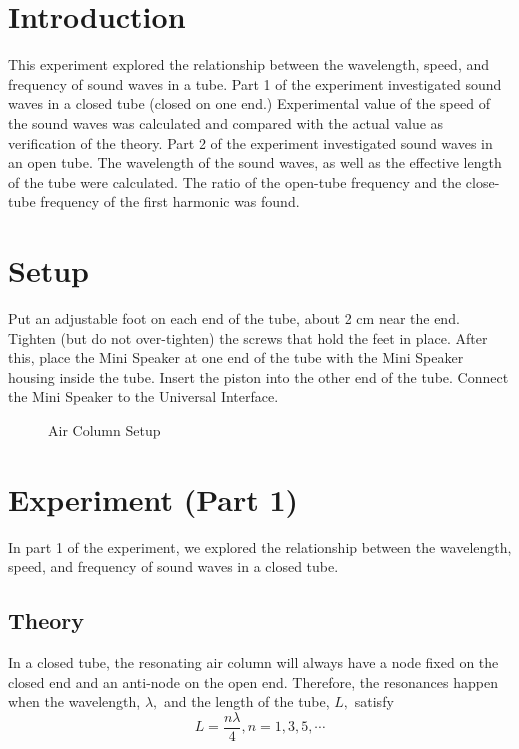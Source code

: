 

\rmfamily

\section{Introduction}

This experiment explored the relationship between the wavelength, speed, and frequency of sound waves in a tube. Part 1 of the experiment investigated sound waves in a closed tube (closed on one end.) Experimental value of the speed of the sound waves was calculated and compared with the actual value as verification of the theory. Part 2 of the experiment investigated sound waves in an open tube. The wavelength of the sound waves, as well as the effective length of the tube were calculated. The ratio of the open-tube frequency and the close-tube frequency of the first harmonic was found.

\section{Setup}
Put an adjustable foot on each end of the tube, about 2 cm near the end. Tighten (but do not over-tighten) the screws that hold the feet in place. After this, place the Mini Speaker at one end of the tube with the Mini Speaker housing inside the tube. Insert the piston into the other end of the tube. Connect the Mini Speaker to the Universal Interface.
\begin{figure}[htb]
	\caption{\label{1} Air Column Setup}
\end{figure}


\section{Experiment (Part 1)}
In part 1 of the experiment, we explored the relationship between the wavelength, speed, and frequency of sound waves in a closed tube.
\subsection{Theory}
In a closed tube, the resonating air column will always have a node fixed on the closed end and an anti-node on the open end. Therefore, the resonances happen when the wavelength,  $\lambda,$ and the length of the tube, $L,$  satisfy $$L= \frac {n\lambda}4,n=1,3,5,\cdots$$

